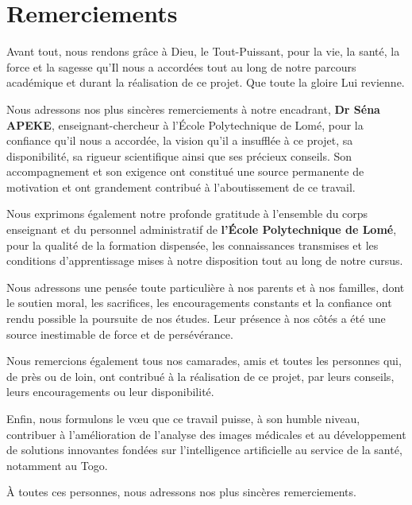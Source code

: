 \documentclass[12pt,a4paper]{report}
\begin{document}
	\restoregeometry
	
	\newpage
	\section*{Remerciements}
	
	Avant tout, nous rendons grâce à Dieu, le Tout-Puissant, pour la vie, la santé, la force et la sagesse qu'Il nous a accordées tout au long de notre parcours académique et durant la réalisation de ce projet. Que toute la gloire Lui revienne.

Nous adressons nos plus sincères remerciements à notre encadrant, \textbf{Dr Séna APEKE}, enseignant-chercheur à l'École Polytechnique de Lomé, pour la confiance qu'il nous a accordée, la vision qu'il a insufflée à ce projet, sa disponibilité, sa rigueur scientifique ainsi que ses précieux conseils. Son accompagnement et son exigence ont constitué une source permanente de motivation et ont grandement contribué à l'aboutissement de ce travail.

Nous exprimons également notre profonde gratitude à l'ensemble du corps enseignant et du personnel administratif de \textbf{l'École Polytechnique de Lomé}, pour la qualité de la formation dispensée, les connaissances transmises et les conditions d'apprentissage mises à notre disposition tout au long de notre cursus.

Nous adressons une pensée toute particulière à nos parents et à nos familles, dont le soutien moral, les sacrifices, les encouragements constants et la confiance ont rendu possible la poursuite de nos études. Leur présence à nos côtés a été une source inestimable de force et de persévérance.

Nous remercions également tous nos camarades, amis et toutes les personnes qui, de près ou de loin, ont contribué à la réalisation de ce projet, par leurs conseils, leurs encouragements ou leur disponibilité.

Enfin, nous formulons le vœu que ce travail puisse, à son humble niveau, contribuer à l'amélioration de l'analyse des images médicales et au développement de solutions innovantes fondées sur l'intelligence artificielle au service de la santé, notamment au Togo.

À toutes ces personnes, nous adressons nos plus sincères remerciements.
\end{document}
